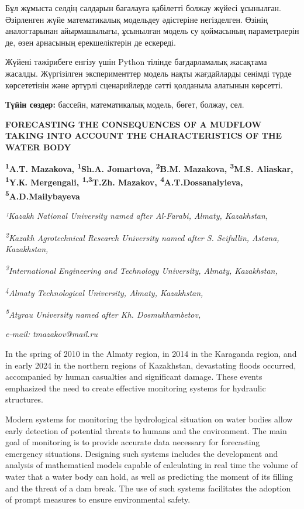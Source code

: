 Бұл жұмыста селдің салдарын бағалауға қабілетті болжау жүйесі ұсынылған.
Әзірленген жүйе математикалық модельдеу әдістеріне негізделген. Өзінің
аналогтарынан айырмашылығы, ұсынылған модель су қоймасының параметрлерін
де, өзен арнасының ерекшеліктерін де ескереді.

Жүйені тәжірибеге енгізу үшін Python тілінде бағдарламалық жасақтама
жасалды. Жүргізілген эксперименттер модель нақты жағдайларды сенімді
түрде көрсететінін және әртүрлі сценарийлерде сәтті қолданыла алатынын
көрсетті.

{\bfseries Түйін сөздер:} бассейн, математикалық модель, бөгет, болжау,
сел.

\begin{articleheader}
{\bfseries FORECASTING THE CONSEQUENCES OF A MUDFLOW TAKING INTO ACCOUNT
THE CHARACTERISTICS OF THE WATER BODY}

{\bfseries \textsuperscript{1}A.T. Mazakova,
\textsuperscript{1}Sh.A. Jomartova,
\textsuperscript{2}B.M. Mazakova,
\textsuperscript{3}M.S. Aliaskar,
\textsuperscript{1}Y.К. Mergengali,
\textsuperscript{1,3}T.Zh. Mazakov,
\textsuperscript{4}A.T.Dossanalyieva,
\textsuperscript{5}A.D.Mailybayeva}
\end{articleheader}

\begin{affiliation}
\emph{¹Kazakh National University named after Al-Farabi, Almaty, Kazakhstan,}

\emph{\textsuperscript{2}Kazakh Agrotechnical Research University named after S. Seifullin, Astana, Kazakhstan,}

\emph{\textsuperscript{3}International Engineering and Technology University, Almaty, Kazakhstan,}

\emph{\textsuperscript{4}Almaty Technological University, Almaty, Kazakhstan,}

\emph{\textsuperscript{5}Atyrau University named after Kh. Dosmukhambetov,}

\emph{e-mail:} \emph{tmazakov@mail.ru}
\end{affiliation}

In the spring of 2010 in the Almaty region, in 2014 in the Karaganda
region, and in early 2024 in the northern regions of Kazakhstan,
devastating floods occurred, accompanied by human casualties and
significant damage. These events emphasized the need to create effective
monitoring systems for hydraulic structures.

Modern systems for monitoring the hydrological situation on water bodies
allow early detection of potential threats to humans and the
environment. The main goal of monitoring is to provide accurate data
necessary for forecasting emergency situations. Designing such systems
includes the development and analysis of mathematical models capable of
calculating in real time the volume of water that a water body can hold,
as well as predicting the moment of its filling and the threat of a dam
break. The use of such systems facilitates the adoption of prompt
measures to ensure environmental safety.

